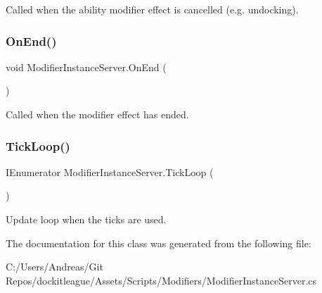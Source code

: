 Called when the ability modifier effect is cancelled (e.\+g. undocking). 

\hypertarget{class_modifier_instance_server_ae96d1f30204b227178e4da20d8b17f84}{}\label{class_modifier_instance_server_ae96d1f30204b227178e4da20d8b17f84} 
\subsubsection{\texorpdfstring{On\+End()}{OnEnd()}}
{\footnotesize\ttfamily void Modifier\+Instance\+Server.\+On\+End (\begin{DoxyParamCaption}{ }\end{DoxyParamCaption})}



Called when the modifier effect has ended. 

\hypertarget{class_modifier_instance_server_ab912c1a035383dc7d396701309ea6e6c}{}\label{class_modifier_instance_server_ab912c1a035383dc7d396701309ea6e6c} 
\subsubsection{\texorpdfstring{Tick\+Loop()}{TickLoop()}}
{\footnotesize\ttfamily I\+Enumerator Modifier\+Instance\+Server.\+Tick\+Loop (\begin{DoxyParamCaption}{ }\end{DoxyParamCaption})}



Update loop when the ticks are used. 



The documentation for this class was generated from the following file\+:\begin{DoxyCompactItemize}
\item 
C\+:/\+Users/\+Andreas/\+Git Repos/dockitleague/\+Assets/\+Scripts/\+Modifiers/Modifier\+Instance\+Server.\+cs\end{DoxyCompactItemize}
